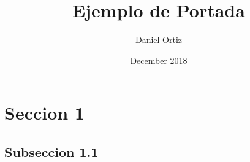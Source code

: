 \documentclass{article}
\title{Ejemplo de Portada}
\author{Daniel Ortiz}
\date{December 2018}
\begin{document}
\maketitle
\section{Seccion 1}
\subsection{Subseccion 1.1}
\end{document}
